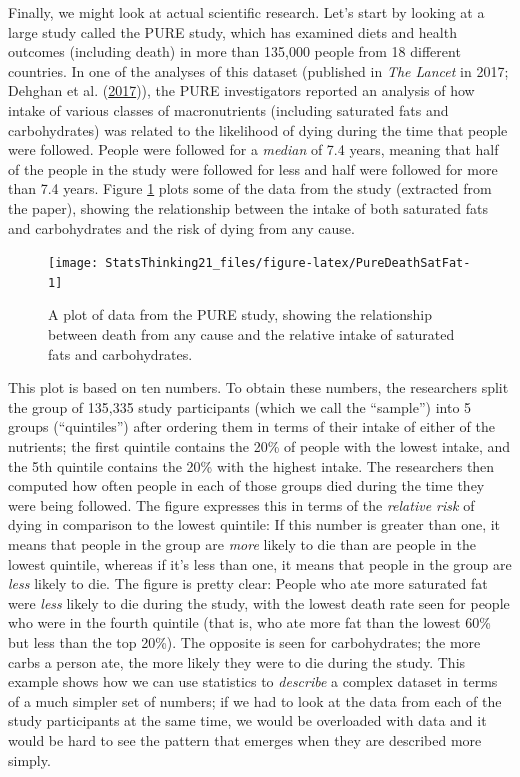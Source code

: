 \documentclass[
  12pt,
]{book}
\begin{document}
Finally, we might look at actual scientific research. Let's start by looking at a large study called the PURE study, which has examined diets and health outcomes (including death) in more than 135,000 people from 18 different countries. In one of the analyses of this dataset (published in \emph{The Lancet} in 2017; Dehghan et al. (\protect\hyperlink{ref-dehg:ment:zhan:2017}{2017})), the PURE investigators reported an analysis of how intake of various classes of macronutrients (including saturated fats and carbohydrates) was related to the likelihood of dying during the time that people were followed. People were followed for a \emph{median} of 7.4 years, meaning that half of the people in the study were followed for less and half were followed for more than 7.4 years. Figure \ref{fig:PureDeathSatFat} plots some of the data from the study (extracted from the paper), showing the relationship between the intake of both saturated fats and carbohydrates and the risk of dying from any cause.

\begin{figure}
\texttt{[image: StatsThinking21\_files/figure-latex/PureDeathSatFat-1]} \caption{A plot of data from the PURE study, showing the relationship between death from any cause and the relative intake of saturated fats and carbohydrates.}\label{fig:PureDeathSatFat}
\end{figure}

This plot is based on ten numbers. To obtain these numbers, the researchers split the group of 135,335 study participants (which we call the ``sample'') into 5 groups (``quintiles'') after ordering them in terms of their intake of either of the nutrients; the first quintile contains the 20\% of people with the lowest intake, and the 5th quintile contains the 20\% with the highest intake. The researchers then computed how often people in each of those groups died during the time they were being followed. The figure expresses this in terms of the \emph{relative risk} of dying in comparison to the lowest quintile: If this number is greater than one, it means that people in the group are \emph{more} likely to die than are people in the lowest quintile, whereas if it's less than one, it means that people in the group are \emph{less} likely to die. The figure is pretty clear: People who ate more saturated fat were \emph{less} likely to die during the study, with the lowest death rate seen for people who were in the fourth quintile (that is, who ate more fat than the lowest 60\% but less than the top 20\%). The opposite is seen for carbohydrates; the more carbs a person ate, the more likely they were to die during the study. This example shows how we can use statistics to \emph{describe} a complex dataset in terms of a much simpler set of numbers; if we had to look at the data from each of the study participants at the same time, we would be overloaded with data and it would be hard to see the pattern that emerges when they are described more simply.
\end{document}
